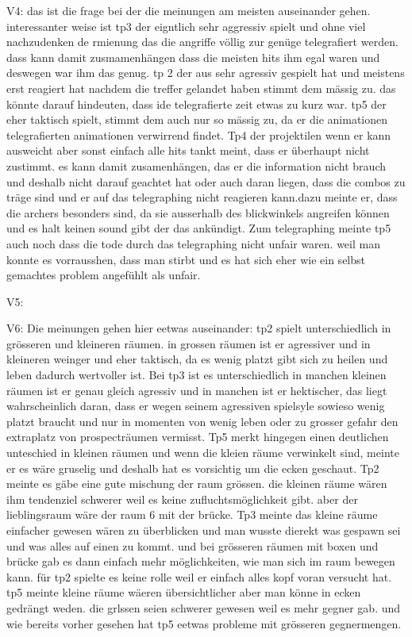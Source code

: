 \documentclass[../Main.tex]{subfiles}
\begin{document}
V4: das ist die frage bei der die meinungen am meisten auseinander gehen. interessanter weise ist tp3 der eigntlich sehr aggressiv spielt und ohne viel nachzudenken de rmienung das die angriffe völlig zur genüge telegrafiert werden. dass kann damit zusmamenhängen dass die meisten hits ihm egal waren und deswegen war ihm das genug. tp 2 der aus sehr agressiv gespielt hat und meistens erst reagiert hat nachdem die treffer gelandet haben stimmt dem mässig zu. das könnte darauf hindeuten, dass ide telegrafierte zeit etwas zu kurz war. tp5 der eher taktisch spielt, stimmt dem auch nur so mässig zu, da er die animationen telegrafierten animationen verwirrend findet. Tp4 der projektilen wenn er kann ausweicht aber sonst einfach alle hits tankt meint, dass er überhaupt nicht zustimmt. es kann damit zusamenhängen, das er die information nicht brauch und deshalb nicht darauf geachtet hat oder auch daran liegen, dass die combos zu träge sind und er auf das telegraphing nicht reagieren kann.dazu meinte er, dass die archers besonders sind, da sie ausserhalb des blickwinkels angreifen können und es halt keinen sound gibt der das ankündigt. Zum telegraphing meinte tp5 auch noch dass die tode durch das telegraphing nicht unfair waren. weil man konnte es vorrausshen, dass man stirbt und es hat sich eher wie ein selbst gemachtes problem angefühlt als unfair.

V5:

V6: Die meinungen gehen hier eetwas auseinander: tp2 spielt unterschiedlich in grösseren und kleineren räumen. in grossen räumen ist er agressiver und in kleineren weinger und eher taktisch, da es wenig platzt gibt sich zu heilen und leben dadurch wertvoller ist. Bei tp3 ist es unterschiedlich in manchen kleinen räumen ist er genau gleich agressiv und in manchen ist er hektischer, das liegt wahrscheinlich daran, dass er wegen seinem agressiven spielsyle sowieso wenig platzt braucht und nur in momenten von wenig leben oder zu grosser gefahr den extraplatz von prospecträumen vermisst. Tp5 merkt hingegen einen deutlichen unteschied in kleinen räumen und wenn die kleien räume verwinkelt sind, meinte er es wäre gruselig und deshalb hat es vorsichtig um die ecken geschaut.
Tp2 meinte es gäbe eine gute mischung der raum grössen. die kleinen räume wären ihm tendenziel schwerer weil es keine zufluchtsmöglichkeit gibt. aber der lieblingsraum wäre der raum 6 mit der brücke. Tp3 meinte das kleine räume einfacher gewesen wären zu überblicken und man wusste dierekt was gespawn sei und was alles auf einen zu kommt. und bei grösseren räumen mit boxen und brücke gab es dann einfach mehr möglichkeiten, wie man sich im raum bewegen kann. für tp2 spielte es keine rolle weil er einfach alles kopf voran versucht hat. tp5 meinte kleine räume wäeren übersichtlicher aber man könne in ecken gedrängt weden. die grlssen seien schwerer gewesen weil es mehr gegner gab. und wie bereits vorher gesehen hat tp5 eetwas probleme mit grösseren gegnermengen.
\end{document}
